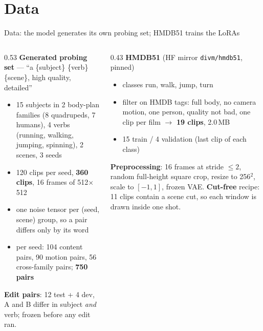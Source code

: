 \documentclass[aspectratio=169,11pt]{beamer}
\newcommand{\code}[1]{\texttt{#1}}
\begin{document}
\section{Data}
\begin{frame}{Data: the model generates its own probing set; HMDB51 trains the LoRAs}
  \begin{columns}[T,onlytextwidth]
    \begin{column}{0.53\textwidth}
      \small
      \textbf{Generated probing set} --- ``a \{subject\} \{verb\} \{scene\}, high quality, detailed''
      \begin{itemize}
        \item 15 subjects in 2 body-plan families (8 quadrupeds, 7 humans), 4 verbs (running,
          walking, jumping, spinning), 2 scenes, 3 seeds
        \item 120 clips per seed, \textbf{360 clips}, 16 frames of 512$\times$512
        \item one noise tensor per (seed, scene) group, so a pair differs only by its word
        \item per seed: 104 content pairs, 90 motion pairs, 56 cross-family pairs; \textbf{750 pairs}
      \end{itemize}
      \textbf{Edit pairs}: 12 test + 4 dev, A and B differ in subject \emph{and} verb; frozen before
      any edit ran.
    \end{column}
    \begin{column}{0.43\textwidth}
      \small
      \textbf{HMDB51} \cite{kuehne2011hmdb} (HF mirror \code{divm/hmdb51}, pinned)
      \begin{itemize}
        \item classes run, walk, jump, turn
        \item filter on HMDB tags: full body, no camera motion, one person, quality not bad,
          one clip per film $\to$ \textbf{19 clips}, 2.0\,MB
        \item 15 train / 4 validation (last clip of each class)
      \end{itemize}
      \textbf{Preprocessing}: 16 frames at stride $\le 2$, random full-height square crop, resize to
      256$^2$, scale to $[-1,1]$, frozen VAE. \textbf{Cut-free} recipe: 11 clips contain a scene
      cut, so each window is drawn inside one shot.
    \end{column}
  \end{columns}
\end{frame}
\end{document}
